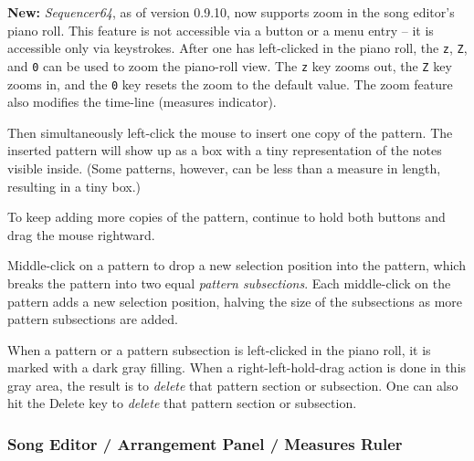    \textbf{New:}
   \textsl{Sequencer64}, as of version 0.9.10, now supports zoom in the song
   editor's piano roll.  This feature is not accessible via a button or a menu
   entry -- it is accessible only via keystrokes.
   After one has left-clicked in the piano roll, the \texttt{z}, \texttt{Z},
   and \texttt{0} can be used to zoom the piano-roll view.  The \texttt{z} key
   zooms out, the \texttt{Z} key zooms in, and the \texttt{0} key resets the
   zoom to the default value.  The zoom feature also modifies the time-line
   (measures indicator).

   Then simultaneously left-click the mouse to insert one copy of the
   pattern.  The inserted pattern will show up as a box with a tiny
   representation of the notes visible inside.  (Some patterns, however, can
   be less than a measure in length, resulting in a tiny box.)

   To keep adding more copies of the pattern, continue to hold both buttons
   and drag the mouse rightward.

   Middle-click on a pattern to drop a new selection position into the
   pattern,
   which breaks the pattern into two equal \textsl{pattern subsections}.
   Each middle-click on the pattern adds a new selection position,
   halving the size of the subsections as more pattern subsections are
   added.

   When a pattern or a pattern subsection is left-clicked in the piano
   roll, it is marked with a dark gray filling.
   When a right-left-hold-drag action is done in this gray area, the result
   is to \textsl{delete} that pattern section or subsection.
   One can also hit the Delete key to \textsl{delete} that pattern section
   or subsection.

\subsubsection{Song Editor / Arrangement Panel / Measures Ruler}
\label{subsubsec:seq64_song_editor_arrangement_panel_measures_ruler}


